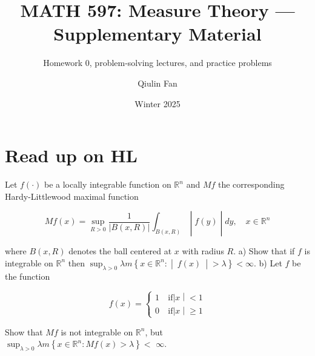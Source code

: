 \documentclass{qlnotes-export}
\title{MATH 597: Measure Theory --- Supplementary Material}
\subtitle{Homework 0, problem-solving lectures, and practice problems}
\author{Qiulin Fan}
\date{Winter 2025}
\begin{document}
\mainmatter
\chapter{Read up on HL}\label{read-up-on-hl}

Let \(f( \cdot )\) be a locally integrable function on \({\mathbb{R}}^{n}\) and \(Mf\) the corresponding Hardy-Littlewood maximal function

\[\left. Mf(x) = \sup\limits_{R > 0}\frac{1}{|B(x,R)|}\int_{B(x,R)} \middle| f(y) \middle| dy,\quad x \in {\mathbb{R}}^{n} \right.\]

where \(B(x,R)\) denotes the ball centered at \(x\) with radius \(R\). a) Show that if \(f\) is integrable on \({\mathbb{R}}^{n}\) then \(\sup_{\lambda > 0}\lambda m\left\{ x \in {\mathbb{R}}^{n}: \middle| \ f(x)\  \middle| > \lambda \right\} < \infty\). b) Let \(f\) be the function

\[f(x) = \left\{ \begin{matrix}
{1\ } & {\text{if}\left| x \middle| < 1 \right.} \\
{0\ } & {\text{if}\left| x \middle| \geq 1 \right.}
\end{matrix} \right.\]

Show that \(Mf\) is not integrable on \({\mathbb{R}}^{n}\), but \(\sup_{\lambda > 0}\lambda m\left\{ {x \in {\mathbb{R}}^{n}:Mf(x) > \lambda} \right\} <\) \(\infty\).
\end{document}
